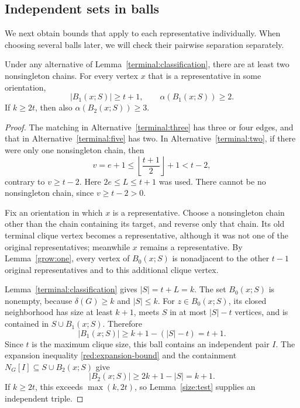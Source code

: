 \subsection{Independent sets in balls}

We next obtain bounds that apply to each representative individually.
When choosing several balls later, we will check their pairwise separation
separately.

\begin{lemma}\label{terminal:weights}
Under any alternative of Lemma~\ref{terminal:classification}, there are at
least two nonsingleton chains.
For every vertex \(x\) that is a representative in some orientation,
\[
 |B_1(x;S)|\ge t+1,\qquad \alpha(B_1(x;S))\ge2.
\]
If \(k\ge2t\), then also \(\alpha(B_2(x;S))\ge3\).
\end{lemma}

\begin{proof}
The matching in Alternative~\ref{terminal:three} has three or four edges,
and that in Alternative~\ref{terminal:five} has two.
In Alternative~\ref{terminal:two}, if there were only one nonsingleton
chain, then
\[
 v=e+1\le\left\lfloor\frac{t+1}{2}\right\rfloor+1<t-2,
\]
contrary to \(v\ge t-2\).
Here \(2e\le L\le t+1\) was used.
There cannot be no nonsingleton chain, since \(v\ge t-2>0\).

Fix an orientation in which \(x\) is a representative.
Choose a nonsingleton chain other than the chain containing its target,
and reverse only that chain.  Its old terminal clique vertex becomes a
representative, although it was not one of the original representatives;
meanwhile \(x\) remains a representative.
By Lemma~\ref{grow:one}, every vertex of \(B_0(x;S)\) is nonadjacent to the
other \(t-1\) original representatives and to this additional clique vertex.

Lemma~\ref{terminal:classification} gives \(|S|=t+L=k\).
The set \(B_0(x;S)\) is nonempty, because \(\delta(G)\ge k\) and
\(|S|\le k\).  For \(z\in B_0(x;S)\), its closed neighborhood has size at
least \(k+1\), meets \(S\) in at most \(|S|-t\) vertices, and is contained
in \(S\cup B_1(x;S)\).  Therefore
\[
 |B_1(x;S)|\ge k+1-(|S|-t)=t+1.
\]
Since \(t\) is the maximum clique size, this ball contains an independent
pair \(I\).  The expansion inequality \eqref{red:expansion-bound} and the
containment \(N_G[I]\subseteq S\cup B_2(x;S)\) give
\[
 |B_2(x;S)|\ge2k+1-|S|=k+1.
\]
If \(k\ge2t\), this exceeds \(\max(k,2t)\), so
Lemma~\ref{size:test} supplies an independent triple.
\end{proof}

